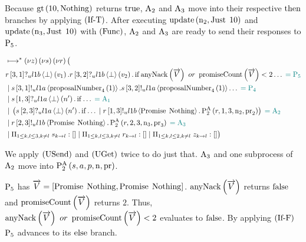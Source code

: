 Because $\greaterThan{10}{\Nothing}$ returns $\True$, $\Acceptor{2}$ and $\Acceptor{3}$ move into their respective $\Then$ branches by applying $\RIfT$.
After executing $\update{\NumberRegister_2}{\Just{10}}$ and $\update{\NumberRegister_3}{\Just{10}}$ with $\RSideEffect$, $\Acceptor{2}$ and $\Acceptor{3}$ are ready to send their responses to $\Proposer{5}$.

\begin{align*}
&\mapstostar \NuChannels \big (\\
&
    \ReceiveUnreliableP{\ChannelR}{3}{1}{\LOneB}{\bot}{v_1}.
    \ReceiveUnreliableP{\ChannelR}{3}{2}{\LOneB}{\bot}{v_2}.
    \If{\anyNack{\VectorV} \tOr \promiseCount{\VectorV} < 2}\ldots
    \comment{= \Proposer{5}}\\
&\Or \SendUnreliableP{\ChannelS}{3}{1}{\LOneA}{\proposalNumber{1}{4}}.\SendUnreliableP{\ChannelS}{3}{2}{\LOneA}{\proposalNumber{1}{4}}\ldots \comment{= \Proposer{4}}\\
&\Or \ReceiveUnreliableP{\ChannelS}{1}{3}{\LOneA}{\bot}{n'}.\If{\ldots} \comment{= \Acceptor{1}}\\
&\Or \Paren{
    \ReceiveUnreliableP{\ChannelS}{2}{3}{\LOneA}{\bot}{n'}.\If{\ldots}
    \Or \SendUnreliableP{\ChannelR}{1}{3}{\LOneB}{\Promise{\Nothing}}.
        \Call{\PaTwo}{\ChannelR, 1, 3, \NumberRegister_2, \ProposalRegister_2}
} \comment{= \Acceptor{2}}\\
&\Or
    \SendUnreliableP{\ChannelR}{2}{3}{\LOneB}{\Promise{\Nothing}}.
    \Call{\PaTwo}{\ChannelR, 2, 3, \NumberRegister_3, \ProposalRegister_3}
    \comment{= \Acceptor{3}}\\
&\Or \InnerSessionQueues{\ChannelS}
\Or \InnerSessionQueues{\ChannelR}
\Or \OuterSessionQueues
\big )
\end{align*}

We apply $\RUsend$ and $\RUget$ twice to do just that.
$\Acceptor{3}$ and one subprocess of $\Acceptor{2}$ move into $\Call{\PaTwo}{\SessionChannel, \AcceptorRole, \ProposerRole, \NumberRegister, \ProposalRegister}$.

$\Proposer{5}$ has $\VectorV = \Bracket{\Promise{\Nothing}, \Promise{\Nothing}}$.
$\anyNack{\VectorV}$ returns $\False$ and $\promiseCount{\VectorV}$ returns $2$.
Thus, $\anyNack{\VectorV} \tOr \promiseCount{\VectorV} < 2$ evaluates to $\False$.
By applying $\RIfF$ $\Proposer{5}$ advances to its $\Else{}$ branch.

